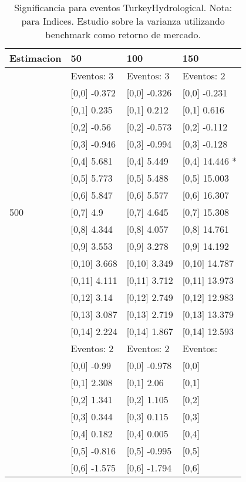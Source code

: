 \begin{table}

\caption{Significancia para eventos TurkeyHydrological. Nota: para Indices. Estudio sobre la varianza utilizando benchmark como retorno de mercado.}
\centering
\begin{tabular}[t]{llll}
\toprule
Estimacion & 50 & 100 & 150\\
\midrule
 & Eventos:  3 & Eventos:  3 & Eventos:  2\\
 & {}[0,0] -0.372 & {}[0,0] -0.326 & {}[0,0] -0.231\\
 & {}[0,1] 0.235 & {}[0,1] 0.212 & {}[0,1] 0.616\\
 & {}[0,2] -0.56 & {}[0,2] -0.573 & {}[0,2] -0.112\\
 & {}[0,3] -0.946 & {}[0,3] -0.994 & {}[0,3] -0.128\\
\addlinespace
 & {}[0,4] 5.681 & {}[0,4] 5.449 & {}[0,4] 14.446 *\\
 & {}[0,5] 5.773 & {}[0,5] 5.488 & {}[0,5] 15.003\\
 & {}[0,6] 5.847 & {}[0,6] 5.577 & {}[0,6] 16.307\\
500 & {}[0,7] 4.9 & {}[0,7] 4.645 & {}[0,7] 15.308\\
 & {}[0,8] 4.344 & {}[0,8] 4.057 & {}[0,8] 14.761\\
\addlinespace
 & {}[0,9] 3.553 & {}[0,9] 3.278 & {}[0,9] 14.192\\
 & {}[0,10] 3.668 & {}[0,10] 3.349 & {}[0,10] 14.787\\
 & {}[0,11] 4.111 & {}[0,11] 3.712 & {}[0,11] 13.973\\
 & {}[0,12] 3.14 & {}[0,12] 2.749 & {}[0,12] 12.983\\
 & {}[0,13] 3.087 & {}[0,13] 2.719 & {}[0,13] 13.379\\
\addlinespace
 & {}[0,14] 2.224 & {}[0,14] 1.867 & {}[0,14] 12.593\\
 & Eventos:  2 & Eventos:  2 & Eventos:\\
 & {}[0,0] -0.99 & {}[0,0] -0.978 & {}[0,0]\\
 & {}[0,1] 2.308 & {}[0,1] 2.06 & {}[0,1]\\
 & {}[0,2] 1.341 & {}[0,2] 1.105 & {}[0,2]\\
\addlinespace
 & {}[0,3] 0.344 & {}[0,3] 0.115 & {}[0,3]\\
 & {}[0,4] 0.182 & {}[0,4] 0.005 & {}[0,4]\\
 & {}[0,5] -0.816 & {}[0,5] -0.995 & {}[0,5]\\
 & {}[0,6] -1.575 & {}[0,6] -1.794 & {}[0,6]\\

\end{tabular}
\end{table}
